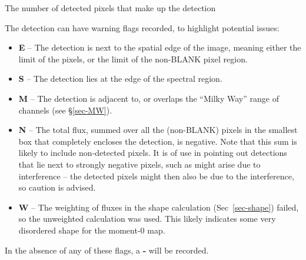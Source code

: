 The number of detected pixels that make up the detection 

\label{sec-flags}

The detection can have warning flags recorded, to highlight potential
issues:
\begin{itemize}
\item \textbf{E} -- The detection is next to the spatial edge of the
  image, meaning either the limit of the pixels, or the limit of the
  non-BLANK pixel region.
\item \textbf{S} -- The detection lies at the edge of the spectral
  region.
\item \textbf{M} -- The detection is adjacent to, or overlaps the
  ``Milky Way'' range of channels (see \S\ref{sec-MW}).
\item \textbf{N} -- The total flux, summed over all the (non-BLANK)
  pixels in the smallest box that completely encloses the detection,
  is negative. Note that this sum is likely to include non-detected
  pixels. It is of use in pointing out detections that lie next to
  strongly negative pixels, such as might arise due to interference --
  the detected pixels might then also be due to the interference, so
  caution is advised.
\item \textbf{W} -- The weighting of fluxes in the shape calculation
  (Sec~\ref{sec-shape}) failed, so the unweighted calculation was
  used. This likely indicates some very disordered shape for the
  moment-0 map.
\end{itemize}
In the absence of any of these flags, a \textbf{-} will be recorded.


